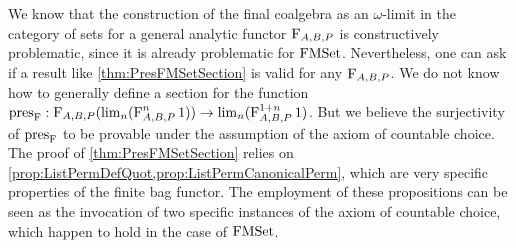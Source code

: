 \documentclass[final,a4paper,USenglish,cleveref]{lipics-v2021}
\begin{document}
We know that the construction of the final coalgebra as an $\omega$-limit in the category of sets for a general analytic functor $\Op{F}_{A,B,P}$ is constructively problematic, since it is already problematic for $\FMSet$.
Nevertheless, one can ask if a result like \cref{thm:PresFMSetSection} is valid for any $\Op{F}_{A,B,P}$. We do not know how to generally define a section for the function $\pres{\Op{F}} : \Op{F}_{A,B,P} (\lim_{n} (\Op{F}_{A,B,P}^n 1)) \to \lim_{n} (\Op{F}_{A,B,P}^{1 + n} 1)$.
But we believe the surjectivity of $\pres{\Op{F}}$ to be provable under the assumption of the axiom of countable choice.
The proof of \cref{thm:PresFMSetSection} relies on \cref{prop:ListPermDefQuot,prop:ListPermCanonicalPerm}, which are very specific properties of the finite bag functor.
The employment of these propositions can be seen as the invocation of two specific instances of the axiom of countable choice, which happen to hold in the case of $\FMSet$.
\end{document}
